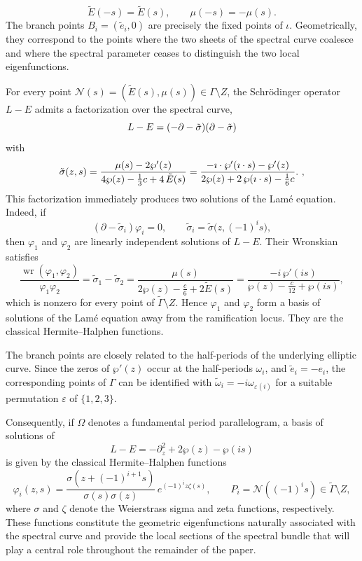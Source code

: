 \documentclass[a4paper,12pt]{article}
\newcommand{\cN}{\mathcal{N}}
\begin{document}
\[
\widetilde E(-s)=\widetilde E(s),
\qquad
\mu(-s)=-\mu(s).
\]
The branch points \(B_i=(\widetilde e_i,0)\) are precisely the fixed
points of \(\iota\). Geometrically, they correspond to the points where
the two sheets of the spectral curve coalesce and where the spectral
parameter ceases to distinguish the two local eigenfunctions.





For every point
\(\cN (s)=(\widetilde E(s),\mu(s))\in\Gamma\setminus Z\),
the Schr\"odinger operator $L-E$ admits a factorization over the spectral curve, 
\[
  L-E =(-\partial -\Tilde{\sigma} )(\partial -\Tilde{\sigma}) 
\]
with
\begin{equation}\label{eq1-factor-L-cnoidal}
\Tilde{\sigma} (z,s) =\frac {\mu(s) -   2\wp'(z)  }{4\wp(z)
-\frac13 c+4\,  \Tilde{E}(s) } 
=\frac {-\imath \cdot  \wp'(\imath \cdot s )  -   \wp'(z)  }{2\wp(z)
 + 2\,  \wp(\imath \cdot s ) -\frac16 c} .
\  , 
\end{equation}
This factorization immediately produces two solutions of the Lamé
equation. Indeed, if
\[
(\partial-\widetilde\sigma_i)\varphi_i=0,
\qquad
\widetilde\sigma_i=
\widetilde\sigma\bigl(z,(-1)^is\bigr),
\tag{31}
\]
then \(\varphi_1\) and \(\varphi_2\) are linearly independent solutions of
\(L-E\). Their Wronskian satisfies
\[
\frac{\operatorname{wr}(\varphi_1,\varphi_2)}
{\varphi_1\varphi_2}
=
\widetilde\sigma_1-\widetilde\sigma_2
=
\frac{\mu(s)}
{2\wp(z)-\frac{c}{6}+2\widetilde E(s)}
=
\frac{-i\,\wp'(is)}
{\wp(z)-\frac{c}{12}+\wp(is)},
\]
which is nonzero for every point of
\(\widetilde{\Gamma}\setminus Z\).
Hence \(\varphi_1\) and \(\varphi_2\) form a basis of solutions of the Lamé
equation away from the ramification locus. They are the classical Hermite–Halphen functions.


The branch points are closely related to the half-periods of the
underlying elliptic curve. Since the zeros of \(\wp'(z)\) occur at the
half-periods \(\omega_i\), and
\(\widetilde e_i=-e_i\), the corresponding points of
\({\Gamma}\) can be identified with
\(\widetilde\omega_i=-i\omega_{\varepsilon(i)}\) for a suitable
permutation \(\varepsilon\) of \(\{1,2,3\}\).

Consequently, if \(\Omega\) denotes a fundamental period parallelogram,
a basis of solutions of
\[
L-E
=
-\partial_z^2+2\wp(z)-\wp(is)
\]
is given by the classical Hermite–Halphen functions
\[
\varphi_i(z,s)
=
\frac{\sigma\!\left(z+(-1)^{i+1}s\right)}
{\sigma(s)\sigma(z)}
\,e^{(-1)^iz\zeta(s)},
\qquad
P_i=\mathcal N((-1)^is)\in
\widetilde\Gamma\setminus Z,
\tag{32}
\]
where \(\sigma\) and \(\zeta\) denote the Weierstrass sigma and zeta
functions, respectively. These functions constitute the geometric
eigenfunctions naturally associated with the spectral curve and provide
the local sections of the spectral bundle that will play a central role
throughout the remainder of the paper.
\end{document}
